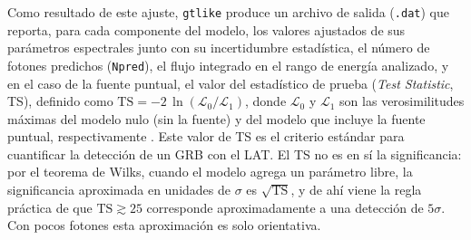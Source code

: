 Como resultado de este ajuste, \texttt{gtlike} produce un archivo de salida (\texttt{.dat}) que reporta, para cada componente del modelo, los valores ajustados de sus parámetros espectrales junto con su incertidumbre estadística, el número de fotones predichos (\texttt{Npred}), el flujo integrado en el rango de energía analizado, y en el caso de la fuente puntual, el valor del estadístico de prueba (\textit{Test Statistic}, TS), definido como $\mathrm{TS} = -2\,\ln(\mathcal{L}_{0}/\mathcal{L}_{1})$, donde $\mathcal{L}_{0}$ y $\mathcal{L}_{1}$ son las verosimilitudes máximas del modelo nulo (sin la fuente) y del modelo que incluye la fuente puntual, respectivamente \cite{Mattox1996}. Este valor de TS es el criterio estándar para cuantificar la detección de un GRB con el LAT. El TS no es en sí la significancia: por el teorema de Wilks, cuando el modelo agrega un parámetro libre, la significancia aproximada en unidades de $\sigma$ es $\sqrt{\mathrm{TS}}$, y de ahí viene la regla práctica de que $\mathrm{TS} \gtrsim 25$ corresponde aproximadamente a una detección de $5\sigma$. Con pocos fotones esta aproximación es solo orientativa.